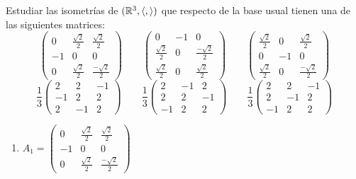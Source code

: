 \begin{ejercicio}
    Estudiar las isometrías de $(\mathbb{R}^3, \langle,\rangle)$ que respecto de la base usual tienen una de las siguientes matrices:
    \begin{equation*}
        \left(\begin{array}{ccc}
            0 & \frac{\sqrt{2}}{2} & \frac{\sqrt{2}}{2} \\
            -1 & 0 & 0 \\
            0 & \frac{\sqrt{2}}{2} & \frac{-\sqrt{2}}{2}
        \end{array}\right)
        \qquad
        \left(\begin{array}{ccc}
            0 & -1 & 0 \\
            \frac{\sqrt{2}}{2} & 0 & \frac{-\sqrt{2}}{2} \\
            \frac{\sqrt{2}}{2} & 0 & \frac{\sqrt{2}}{2}
        \end{array}\right)
        \qquad
        \left(\begin{array}{ccc}
            \frac{\sqrt{2}}{2} & 0 & \frac{\sqrt{2}}{2} \\
            0 & -1 & 0 \\
            \frac{\sqrt{2}}{2} & 0 & \frac{-\sqrt{2}}{2}
        \end{array}\right)
    \end{equation*}
    \begin{equation*}
        \frac{1}{3}\left(\begin{array}{ccc}
            2 & 2 & -1 \\
            -1 & 2 & 2 \\
            2 & -1 & 2
        \end{array}\right)
        \qquad
        \frac{1}{3}\left(\begin{array}{ccc}
            2 & -1 & 2 \\
            2 & 2 & -1 \\
            -1 & 2 & 2
        \end{array}\right)
        \qquad
        \frac{1}{3}\left(\begin{array}{ccc}
            2 & 2 & -1 \\
            2 & -1 & 2 \\
            -1 & 2 & 2
        \end{array}\right)
    \end{equation*}

    \begin{enumerate}
        \item $A_1=\left(\begin{array}{ccc}
            0 & \frac{\sqrt{2}}{2} & \frac{\sqrt{2}}{2} \\
            -1 & 0 & 0 \\
            0 & \frac{\sqrt{2}}{2} & \frac{-\sqrt{2}}{2}
        \end{array}\right)$


\end{enumerate}
\end{ejercicio}
